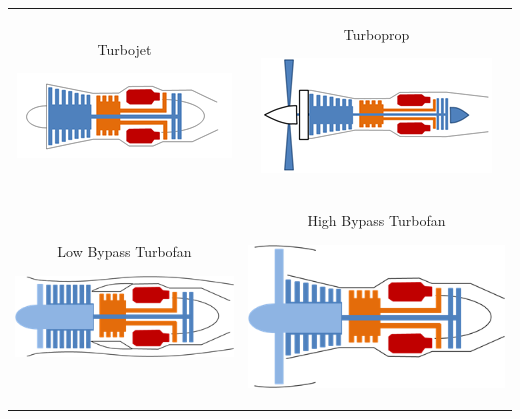 \documentclass[
]{book}
\begin{document}
\begin{longtable}[]{@{}cc@{}}
\toprule
\endhead
\begin{minipage}[t]{0.46\columnwidth}\centering
Turbojet

\includegraphics{media/17/turbojet.png}\strut
\end{minipage} & \begin{minipage}[t]{0.48\columnwidth}\centering
Turboprop

\includegraphics{media/17/turboprop.png}\strut
\end{minipage}\tabularnewline
\begin{minipage}[t]{0.46\columnwidth}\centering
Low Bypass Turbofan

\includegraphics{media/17/low-bypass-turbofan.png}\strut
\end{minipage} & \begin{minipage}[t]{0.48\columnwidth}\centering
High Bypass Turbofan

\includegraphics{media/17/high-bypass-turbofan.png}\strut
\end{minipage}\tabularnewline
\bottomrule
\end{longtable}
\end{document}
